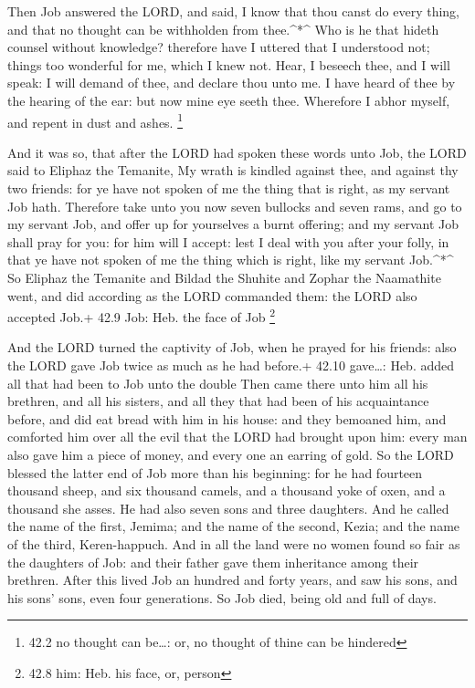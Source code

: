  Then Job answered the LORD, and said,  I know
that thou canst do every thing, and that no thought can be withholden
from thee.\^{}*\^{}  Who is he that hideth counsel without
knowledge? therefore have I uttered that I understood not; things too
wonderful for me, which I knew not.  Hear, I beseech thee,
and I will speak: I will demand of thee, and declare thou unto me.
 I have heard of thee by the hearing of the ear: but now
mine eye seeth thee.  Wherefore I abhor myself, and repent
in dust and ashes. \footnote{42.2 no thought can be\ldots: or, no
  thought of thine can be hindered}

 And it was so, that after the LORD had spoken these words
unto Job, the LORD said to Eliphaz the Temanite, My wrath is kindled
against thee, and against thy two friends: for ye have not spoken of me
the thing that is right, as my servant Job hath.  Therefore
take unto you now seven bullocks and seven rams, and go to my servant
Job, and offer up for yourselves a burnt offering; and my servant Job
shall pray for you: for him will I accept: lest I deal with you after
your folly, in that ye have not spoken of me the thing which is right,
like my servant Job.\^{}*\^{}  So Eliphaz the Temanite and
Bildad the Shuhite and Zophar the Naamathite went, and did according as
the LORD commanded them: the LORD also accepted Job.+ 42.9 Job: Heb. the
face of Job \footnote{42.8 him: Heb. his face, or, person}

 And the LORD turned the captivity of Job, when he prayed
for his friends: also the LORD gave Job twice as much as he had before.+
42.10 gave\ldots: Heb. added all that had been to Job unto the double
 Then came there unto him all his brethren, and all his
sisters, and all they that had been of his acquaintance before, and did
eat bread with him in his house: and they bemoaned him, and comforted
him over all the evil that the LORD had brought upon him: every man also
gave him a piece of money, and every one an earring of gold.
 So the LORD blessed the latter end of Job more than his
beginning: for he had fourteen thousand sheep, and six thousand camels,
and a thousand yoke of oxen, and a thousand she asses.  He
had also seven sons and three daughters.  And he called the
name of the first, Jemima; and the name of the second, Kezia; and the
name of the third, Keren-happuch.  And in all the land were
no women found so fair as the daughters of Job: and their father gave
them inheritance among their brethren.  After this lived
Job an hundred and forty years, and saw his sons, and his sons' sons,
even four generations.  So Job died, being old and full of
days.
